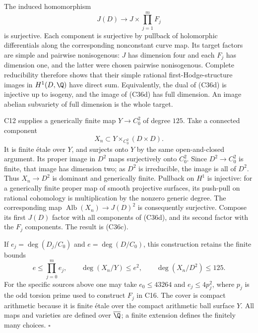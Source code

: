 The induced homomorphism
\[
                  J(D)\longrightarrow
                         J\times\prod_{j=1}^mF_j
 \tag{C36d}
\]
is surjective. Each component is surjective by pullback
of holomorphic differentials along the corresponding
nonconstant curve map. Its target factors are simple
and pairwise nonisogenous: $J$ has dimension four and
each $F_j$ has dimension one, and the latter were chosen
pairwise nonisogenous. Complete reducibility therefore
shows that their simple rational first-Hodge-structure
images in $H^1(D,\Q)$ have direct sum. Equivalently,
the dual of (C36d) is injective up to isogeny, and the
image of (C36d) has full dimension. An image abelian
subvariety of full dimension is the whole target.

C12 supplies a generically finite map
$Y\to C_0^2$ of degree $125$. Take a connected component
\[
                   X_n\subset Y\times_{C_0^2}(D\times D).
 \tag{C36e}
\]
It is finite \'etale over $Y$, and surjects onto $Y$
by the same open-and-closed argument. Its proper image
in $D^2$ maps surjectively onto $C_0^2$. Since
$D^2\to C_0^2$ is finite, that image has dimension two;
as $D^2$ is irreducible, the image is all of $D^2$.
Thus $X_n\to D^2$ is dominant and generically finite.
Pullback on $H^1$ is injective: for a generically finite
proper map of smooth projective surfaces, its push-pull
on rational cohomology is multiplication by the nonzero
generic degree. The corresponding map
$\operatorname{Alb}(X_n)\to J(D)^2$ is consequently
surjective. Compose its first $J(D)$ factor with all
components of (C36d), and its second factor with the
$F_j$ components. The result is (C36c).

If $e_j=\deg(D_j/C_0)$ and $e=\deg(D/C_0)$, this
construction retains the finite bounds
\[
 e\le\prod_{j=0}^m e_j,\qquad
 \deg(X_n/Y)\le e^2,\qquad
 \deg(X_n/D^2)\le125.
 \tag{C36f}
\]
For the specific sources above one may take
$e_0\le43264$ and $e_j\le4p_j^2$, where $p_j$ is the
odd torsion prime used to construct $F_j$ in C16.
The cover is compact arithmetic because it is finite
\'etale over the compact arithmetic ball surface $Y$.
All maps and varieties are defined over $\overline\Q$;
a finite extension defines the finitely many choices.
\hfill$\square$

